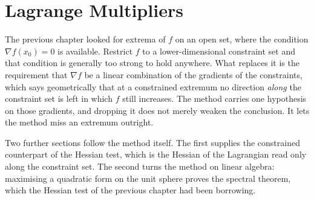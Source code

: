 \chapter{Lagrange Multipliers}
\label{ch:lagrange}

The previous chapter looked for extrema of $f$ on an open set, where the condition
$\nabla f(x_0) = 0$ is available. Restrict $f$ to a lower-dimensional constraint set and that
condition is generally too strong to hold anywhere. What replaces it is the requirement that
$\nabla f$ be a linear combination of the gradients of the constraints, which says geometrically
that at a constrained extremum no direction \emph{along} the constraint set is left in which $f$
still increases. The method carries one hypothesis on those gradients, and dropping it does not
merely weaken the conclusion. It lets the method miss an extremum outright.

Two further sections follow the method itself. The first supplies the constrained counterpart of
the Hessian test, which is the Hessian of the Lagrangian read only along the constraint set. The
second turns the method on linear algebra: maximising a quadratic form on the unit sphere proves
the spectral theorem, which the Hessian test of the previous chapter had been borrowing.





